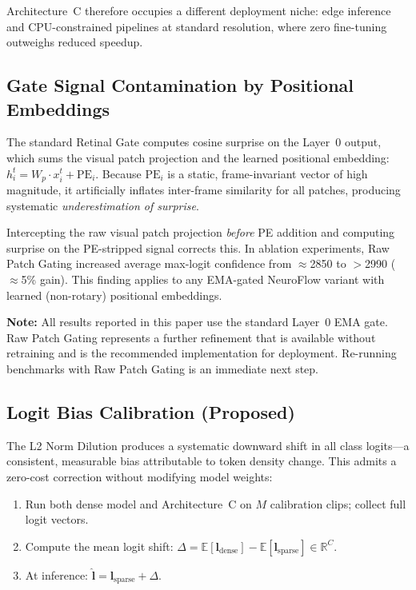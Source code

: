 \documentclass{article}
\begin{document}
Architecture~C therefore occupies a different deployment niche:
edge inference and CPU-constrained pipelines at standard resolution,
where zero fine-tuning outweighs reduced speedup.

\subsection{Gate Signal Contamination by Positional Embeddings}
\label{sec:limit-pe-contamination}

The standard Retinal Gate computes cosine surprise on the Layer~0 output,
which sums the visual patch projection and the learned positional embedding:
$h_i^t = W_p \cdot x_i^t + \mathrm{PE}_i$. Because $\mathrm{PE}_i$ is a
static, frame-invariant vector of high magnitude, it artificially inflates
inter-frame similarity for all patches, producing systematic
\emph{underestimation of surprise}.

Intercepting the raw visual patch projection \emph{before} PE addition and
computing surprise on the PE-stripped signal corrects this. In ablation
experiments, Raw Patch Gating increased average max-logit confidence from
$\approx$2850 to $>$2990 ($\approx$5\% gain). This finding applies to any
EMA-gated NeuroFlow variant with learned (non-rotary) positional embeddings.

\textbf{Note:} All results reported in this paper use the standard Layer~0
EMA gate. Raw Patch Gating represents a further refinement that is available
without retraining and is the recommended implementation for deployment.
Re-running benchmarks with Raw Patch Gating is an immediate next step.

\subsection{Logit Bias Calibration (Proposed)}
\label{sec:fw-logit-calibration}

The L2 Norm Dilution produces a systematic downward shift in all class
logits---a consistent, measurable bias attributable to token density change.
This admits a zero-cost correction without modifying model weights:

\begin{enumerate}
\item Run both dense model and Architecture~C on $M$ calibration clips;
collect full logit vectors.
\item Compute the mean logit shift: $\Delta = \mathbb{E}[\mathbf{l}_{\text{dense}}]
- \mathbb{E}[\mathbf{l}_{\text{sparse}}] \in \mathbb{R}^C$.
\item At inference: $\hat{\mathbf{l}} = \mathbf{l}_{\text{sparse}} + \Delta$.
\end{enumerate}
\end{document}
